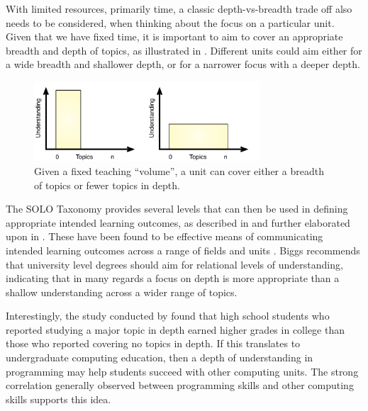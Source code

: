 With limited resources, primarily time, a classic depth-vs-breadth trade off also needs to be considered, when thinking about the focus on a particular unit. Given that we have fixed time, it is important to aim to cover an appropriate breadth and depth of topics, as illustrated in . Different units could aim either for a wide breadth and shallower depth, or for a narrower focus with a deeper depth.

\begin{figure}[htbp]
	\centering
	\includegraphics[width=0.75\textwidth]{DepthOrBreadth}
	\caption{Given a fixed teaching ``volume'', a unit can cover either a breadth of topics or fewer topics in depth.}
	\label{fig:depth}
\end{figure}

%
%

The SOLO Taxonomy \cite{Biggs:1982} provides several levels that can then be used in defining appropriate intended learning outcomes, as described in \citet{Biggs:1996c} and further elaborated upon in \citet{Biggs:2007}. These have been found to be effective means of communicating intended learning outcomes across a range of fields and units \cite{Brabrand:2007,Brabrand:2009}. Biggs recommends that university level degrees should aim for relational levels of understanding, indicating that in many regards a focus on depth is more appropriate than a shallow understanding across a wider range of topics.

Interestingly, the study conducted by \citet{Schwartz:2009} found that high school students who reported studying a major topic in depth earned higher grades in college than those who reported covering no topics in depth. If this translates to undergraduate computing education, then a depth of understanding in programming may help students succeed with other computing units. The strong correlation generally observed between programming skills and other computing skills \cite{McGettrick:2005} supports this idea.

